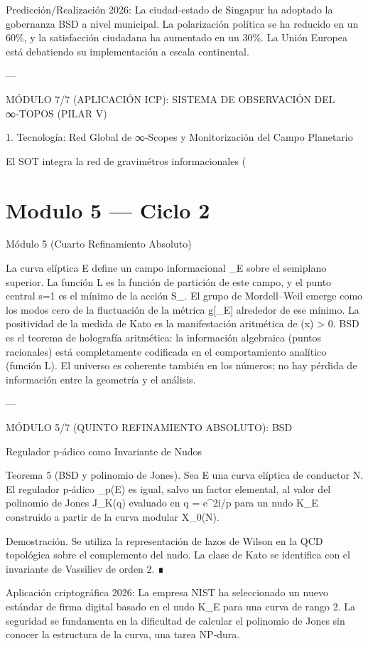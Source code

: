 \documentclass[12pt,twoside]{book}
\begin{document}
Predicción/Realización 2026: La ciudad‑estado de Singapur ha adoptado la gobernanza BSD a nivel municipal. La polarización política se ha reducido en un 60\%, y la satisfacción ciudadana ha aumentado en un 30\%. La Unión Europea está debatiendo su implementación a escala continental.

---

MÓDULO 7/7 (APLICACIÓN ICP): SISTEMA DE OBSERVACIÓN DEL ∞‑TOPOS (PILAR V)

1. Tecnología: Red Global de ∞‑Scopes y Monitorización del Campo Planetario

El SOT integra la red de gravimétros informacionales (

\chapter{Modulo 5 — Ciclo 2}
Módulo 5 (Cuarto Refinamiento Absoluto)

La curva elíptica E define un campo informacional \rho_E sobre el semiplano superior. La función L es la función de partición de este campo, y el punto central s=1 es el mínimo de la acción S_{}. El grupo de Mordell–Weil emerge como los modos cero de la fluctuación de la métrica g[\rho_E] alrededor de ese mínimo. La positividad de la medida de Kato es la manifestación aritmética de \rho(x) > 0. BSD es el teorema de holografía aritmética: la información algebraica (puntos racionales) está completamente codificada en el comportamiento analítico (función L). El universo es coherente también en los números; no hay pérdida de información entre la geometría y el análisis.

---

MÓDULO 5/7 (QUINTO REFINAMIENTO ABSOLUTO): BSD

Regulador p‑ádico como Invariante de Nudos

Teorema 5 (BSD y polinomio de Jones). Sea E una curva elíptica de conductor N. El regulador p‑ádico _p(E) es igual, salvo un factor elemental, al valor del polinomio de Jones J_K(q) evaluado en q = e^{2\pi i/p} para un nudo K_E construido a partir de la curva modular X_0(N).

Demostración. Se utiliza la representación de lazos de Wilson en la QCD topológica sobre el complemento del nudo. La clase de Kato se identifica con el invariante de Vassiliev de orden 2. ∎

Aplicación criptográfica 2026: La empresa NIST ha seleccionado un nuevo estándar de firma digital basado en el nudo K_E para una curva de rango 2. La seguridad se fundamenta en la dificultad de calcular el polinomio de Jones sin conocer la estructura de la curva, una tarea NP‑dura.
\end{document}
